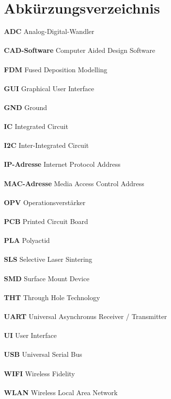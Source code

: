 \documentclass[titlepage,12pt,twoside]{article}
\begin{document}
\newpage
\section{Abkürzungsverzeichnis}

{\large \textbf{ADC}} Analog-Digital-Wandler \\
\\
{\large \textbf{CAD-Software}} Computer Aided Design Software \\
\\
{\large \textbf{FDM}} Fused Deposition Modelling \\
\\
{\large \textbf{GUI}} Graphical User Interface \\
\\
{\large \textbf{GND}} Ground \\
\\
{\large \textbf{IC}} Integrated Circuit \\
\\
{\large \textbf{I2C}} Inter-Integrated Circuit \\
\\
{\large \textbf{IP-Adresse}} Internet Protocol Address \\
\\
{\large \textbf{MAC-Adresse}} Media Access Control Address \\
\\
{\large \textbf{OPV}} Operationsverstärker \\
\\
{\large \textbf{PCB}} Printed Circuit Board \\
\\
{\large \textbf{PLA}} Polyactid \\
\\
{\large \textbf{SLS}} Selective Laser Sintering \\
\\
{\large \textbf{SMD}} Surface Mount Device \\
\\
{\large \textbf{THT}} Through Hole Technology \\
\\
{\large \textbf{UART}} Universal Asynchronus Receiver / Transmitter \\
\\
{\large \textbf{UI}} User Interface \\
\\
{\large \textbf{USB}} Universal Serial Bus \\
\\
{\large \textbf{WIFI}} Wireless Fidelity \\
\\
{\large \textbf{WLAN}} Wireless Local Area Network \\
\\
\end{document}
